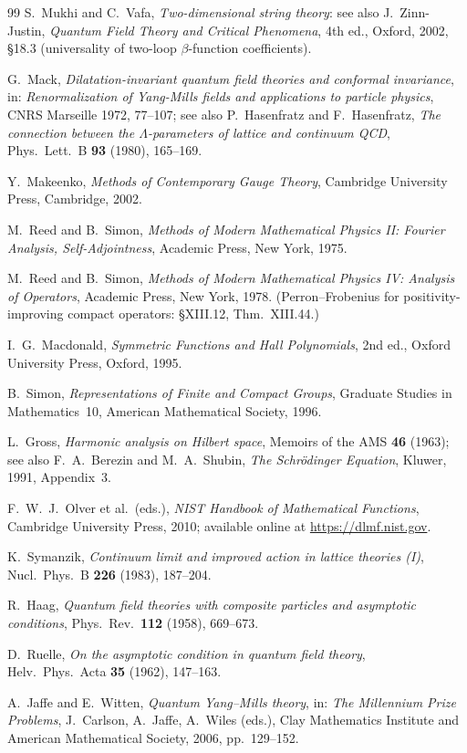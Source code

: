 \documentclass[11pt,a4paper]{amsart}
\theoremstyle{definition}
\begin{document}
\begin{thebibliography}{99}
S.~Mukhi and C.~Vafa,
\textit{Two-dimensional string theory}: see also
J.~Zinn-Justin,
\textit{Quantum Field Theory and Critical Phenomena}, 4th ed., Oxford, 2002,
§18.3 (universality of two-loop $\beta$-function coefficients).

G.~Mack,
\textit{Dilatation-invariant quantum field theories and conformal invariance},
in: \textit{Renormalization of Yang-Mills fields and applications to particle physics},
CNRS Marseille 1972, 77--107;
see also P.~Hasenfratz and F.~Hasenfratz,
\textit{The connection between the $\Lambda$-parameters of lattice and continuum QCD},
Phys.~Lett.~B \textbf{93} (1980), 165--169.

Y.~Makeenko,
\textit{Methods of Contemporary Gauge Theory},
Cambridge University Press, Cambridge, 2002.

M.~Reed and B.~Simon,
\textit{Methods of Modern Mathematical Physics II: Fourier Analysis,
Self-Adjointness}, Academic Press, New York, 1975.

M.~Reed and B.~Simon,
\textit{Methods of Modern Mathematical Physics IV: Analysis of Operators},
Academic Press, New York, 1978.
(Perron--Frobenius for positivity-improving compact operators: §XIII.12, Thm.~XIII.44.)

I.~G.~Macdonald,
\textit{Symmetric Functions and Hall Polynomials},
2nd ed., Oxford University Press, Oxford, 1995.

B.~Simon,
\textit{Representations of Finite and Compact Groups},
Graduate Studies in Mathematics~10, American Mathematical Society, 1996.

L.~Gross,
\textit{Harmonic analysis on Hilbert space},
Memoirs of the AMS \textbf{46} (1963);
see also F.~A.~Berezin and M.~A.~Shubin,
\textit{The Schr\"odinger Equation}, Kluwer, 1991, Appendix~3.

F.~W.~J.~Olver et al.\ (eds.),
\textit{NIST Handbook of Mathematical Functions},
Cambridge University Press, 2010;
available online at \url{https://dlmf.nist.gov}.

K.~Symanzik,
\textit{Continuum limit and improved action in lattice theories (I)},
Nucl.\ Phys.\ B \textbf{226} (1983), 187--204.

R.~Haag,
\textit{Quantum field theories with composite particles and asymptotic conditions},
Phys.\ Rev.\ \textbf{112} (1958), 669--673.

D.~Ruelle,
\textit{On the asymptotic condition in quantum field theory},
Helv.\ Phys.\ Acta \textbf{35} (1962), 147--163.

A.~Jaffe and E.~Witten,
\textit{Quantum Yang--Mills theory},
in: \textit{The Millennium Prize Problems},
J.~Carlson, A.~Jaffe, A.~Wiles (eds.),
Clay Mathematics Institute and American Mathematical Society, 2006, pp.~129--152.
\end{thebibliography}
\end{document}
